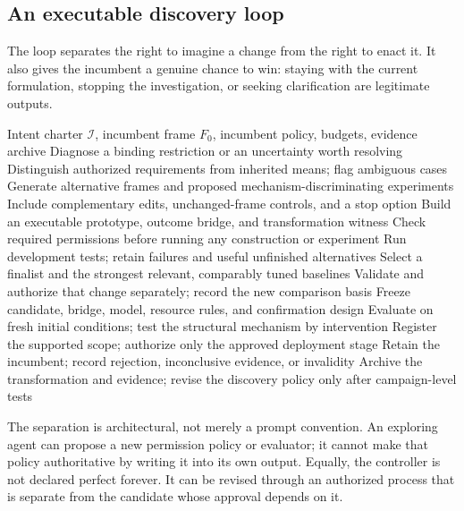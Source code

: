 \documentclass[11pt,letterpaper]{article}
\newcommand{\I}{\mathcal I}
\theoremstyle{remark}\newtheorem{remark}{Remark}[section]
\begin{document}
\subsection{An executable discovery loop}
The loop separates the right to imagine a change from the right to enact it. It also gives the incumbent a genuine chance to win: staying with the current formulation, stopping the investigation, or seeking clarification are legitimate outputs.
\begin{algorithm}[htbp]
\caption{Transformational discovery and demonstration}
\label{alg:loop}
\small
\begin{algorithmic}[1]
\Require Intent charter $\I$, incumbent frame $F_0$, incumbent policy, budgets, evidence archive
\State Diagnose a binding restriction or an uncertainty worth resolving
\State Distinguish authorized requirements from inherited means; flag ambiguous cases
\State Generate alternative frames and proposed mechanism-discriminating experiments
\State Include complementary edits, unchanged-frame controls, and a stop option
  \State Build an executable prototype, outcome bridge, and transformation witness
  \State Check required permissions before running any construction or experiment
  \State Run development tests; retain failures and useful unfinished alternatives
\EndFor
\State Select a finalist and the strongest relevant, comparably tuned baselines
  \State Validate and authorize that change separately; record the new comparison basis
\EndIf
\State Freeze candidate, bridge, model, resource rules, and confirmation design
\State Evaluate on fresh initial conditions; test the structural mechanism by intervention
  \State Register the supported scope; authorize only the approved deployment stage
\Else
  \State Retain the incumbent; record rejection, inconclusive evidence, or invalidity
\EndIf
\State Archive the transformation and evidence; revise the discovery policy only after campaign-level tests
\end{algorithmic}
\end{algorithm}

The separation is architectural, not merely a prompt convention. An exploring agent can propose a new permission policy or evaluator; it cannot make that policy authoritative by writing it into its own output. Equally, the controller is not declared perfect forever. It can be revised through an authorized process that is separate from the candidate whose approval depends on it.
\end{document}

